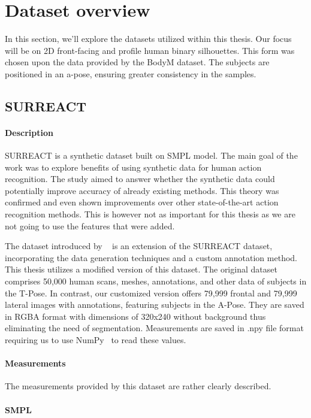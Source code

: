 \chapter{Dataset overview}
In this section, we'll explore the datasets utilized within this thesis. Our focus will be on 2D front-facing and profile human binary silhouettes. This form was chosen upon the data provided by the BodyM dataset. The subjects are positioned in an a-pose, ensuring greater consistency in the samples.
\section{SURREACT}
\subsubsection{Description}
SURREACT \cite{surreact} is a synthetic dataset built on SMPL model. The main goal of the work was to explore benefits of using synthetic data for  human action recognition.  The study aimed to answer whether the synthetic data could potentially improve accuracy of already existing methods. This theory was confirmed and even shown improvements over other state-of-the-art action recognition methods. This is however not as important for this thesis as we are not going to use the features that were added.

The dataset introduced by ~\cite{super} is an extension of the SURREACT dataset, incorporating the data generation techniques and a custom annotation method. This thesis utilizes a modified version of this dataset. The original dataset comprises 50,000 human scans, meshes, annotations, and other data of subjects in the T-Pose. In contrast, our customized version offers 79,999 frontal and 79,999 lateral images with annotations, featuring subjects in the A-Pose.  They are saved in RGBA format with dimensions of 320x240 without background thus eliminating the need of segmentation. Measurements are saved in .npy file format requiring us to use NumPy~\cite{numpy} to read these values.

\subsubsection{Measurements}
The measurements provided by this dataset are rather clearly described.

\subsubsection{SMPL}

